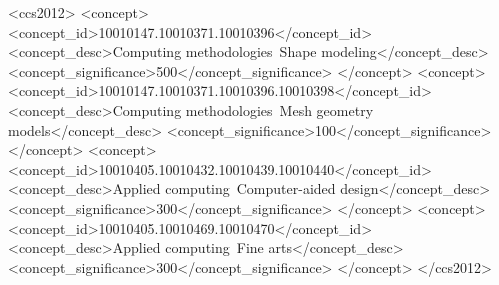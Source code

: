 \documentclass[acmlarge,screen]{acmart}
\begin{document}
%
%
 \begin{CCSXML}
<ccs2012>
<concept>
<concept_id>10010147.10010371.10010396</concept_id>
<concept_desc>Computing methodologies~Shape modeling</concept_desc>
<concept_significance>500</concept_significance>
</concept>
<concept>
<concept_id>10010147.10010371.10010396.10010398</concept_id>
<concept_desc>Computing methodologies~Mesh geometry models</concept_desc>
<concept_significance>100</concept_significance>
</concept>
<concept>
<concept_id>10010405.10010432.10010439.10010440</concept_id>
<concept_desc>Applied computing~Computer-aided design</concept_desc>
<concept_significance>300</concept_significance>
</concept>
<concept>
<concept_id>10010405.10010469.10010470</concept_id>
<concept_desc>Applied computing~Fine arts</concept_desc>
<concept_significance>300</concept_significance>
</concept>
</ccs2012>
\end{CCSXML}




%


\end{document}
